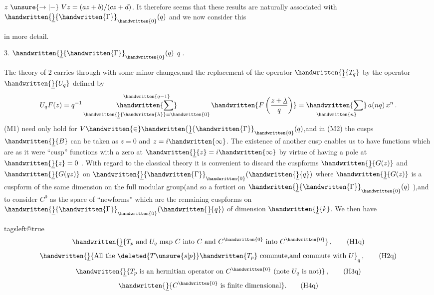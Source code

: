 $z\ \unsure{\rightarrow|-}\ Vz=(az+b)/(cz+d)$. It therefore seems that these results are naturally associated with $\handwritten{\underline}{\handwritten{\Gamma}}_{\handwritten{0}}(q)$ and we now consider this


in more detail.

3.   $\handwritten{\underline}{\handwritten{\Gamma}}_{\handwritten{0}}(q)$  $q$ .

The theory of \handwritten{\S}2 carries through with some minor changes,and the replacement of the operator $\handwritten{\underline}{T_q}$ by the operator $\handwritten{\underline}{U_q}$ defined by
\[
 U_q F(z)=q^{-1}\mathop{\handwritten{\sum}}\limits_{\handwritten{\underline}{\handwritten{\lambda}}=\handwritten{0}}^{\handwritten{q-1}} \handwritten{F\left(\frac{z+\underline{\lambda}}{q}\right)}=\mathop{\handwritten{\sum}}\limits_{\handwritten{n}}a(nq)\,x^n\,.
\]
(M1) need only hold for $V \handwritten{\in}\handwritten{\underline}{\handwritten{\Gamma}}_{\handwritten{0}}(q)$,and in (M2) the  cusps $\handwritten{\underline}{B}$ can be taken as $z=0$ and $z=i\handwritten{\infty}$. The existence of another cusp enables us to have functions which are as it were ``cusp'' functions with a zero at $\handwritten{\underline}{z}=i\handwritten{\infty}$ by virtue of having a pole at $\handwritten{\underline}{z}=0$ . With regard to the classical theory it is convenient to discard the cuspforms $\handwritten{\underline}{G(z)}$ and $\handwritten{\underline}{G(qz)}$ on $\handwritten{\underline}{\handwritten{\Gamma}}_{\handwritten{0}}(\handwritten{\underline}{q})$ where $\handwritten{\underline}{G(z)}$ is a cuspform of the same dimension on the full modular group(and so a fortiori on $\handwritten{\underline}{\handwritten{\Gamma}}_{\handwritten{0}}(q)$ ),and to consider $C^0$ as the space of ``newforms'' which are the remaining cuspforms on $\handwritten{\underline}{\handwritten{\Gamma}}_{\handwritten{0}}(\handwritten{\underline}{q})$ of dimension $\handwritten{\underline}{k}$. We then have

\begingroup\csname tagsleft@true\endcsname
\[
 \handwritten{\underline}{T_p\text{ and }U_q\text{ map }C\text{ into }C\text{ and }C^{\handwritten{0}}\text{ into }C^{\handwritten{0}}}\,, \tag*{(H1q)}
\]
\[
 \handwritten{\underline}{\text{All the } \deleted{T\unsure{s|p}}\handwritten{T_p}\text{ commute,and commute with }U}_{q}\,, \tag*{(H2q)}
\]
\[
 \handwritten{\underline}{T_p\text{ is an hermitian operator on }C^{\handwritten{0}}\text{ (note }U_q\text{ is not)}}\,, \tag*{(H3q)}
\]
\[
 \handwritten{\underline}{C^{\handwritten{0}}\text{ is finite dimensional}}. \tag*{(H4q)}
\]
\endgroup

